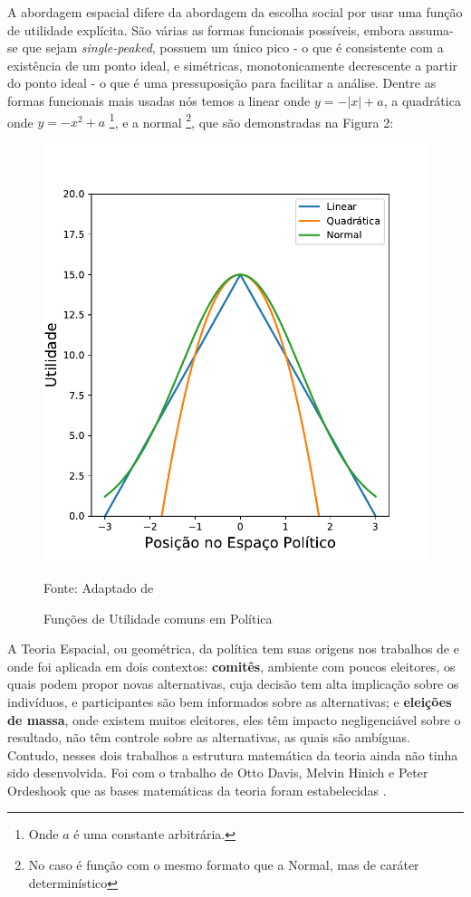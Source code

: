 A abordagem espacial difere da abordagem da escolha social por usar uma função
de utilidade explícita. São várias as formas funcionais possíveis, embora
assuma-se que sejam \textit{single-peaked}, possuem um único pico - o que é
consistente com a existência de um ponto ideal, e simétricas, monotonicamente
decrescente a partir do ponto ideal - o que é uma pressuposição para facilitar a
análise. Dentre as formas funcionais mais usadas nós temos a linear onde $y =
-|x| + a $, a quadrática onde $y = -x^2 + a$ \footnote{ Onde $a$ é uma constante
  arbitrária.}, e a normal \footnote{No caso é função com o mesmo formato que a
  Normal, mas de caráter determinístico}, que são demonstradas na Figura 2:

\begin{figure}[H]
  \centering \includegraphics[scale = 0.8]{ims/utilities.pdf}
  \caption{Funções de Utilidade comuns em Política}
  Fonte: Adaptado de 
\end{figure}

A Teoria Espacial, ou geométrica, da política tem suas origens nos trabalhos de
 e  onde foi aplicada
em dois contextos: \textbf{comitês}, ambiente com poucos eleitores, os quais
podem propor novas alternativas, cuja decisão tem alta implicação sobre os
indivíduos, e participantes são bem informados sobre as alternativas; e
\textbf{eleições de massa}, onde existem muitos eleitores, eles têm impacto
negligenciável sobre o resultado, não têm controle sobre as alternativas, as
quais são ambíguas. Contudo, nesses dois trabalhos a estrutura matemática da
teoria ainda não tinha sido desenvolvida. Foi com o trabalho de Otto Davis,
Melvin Hinich e Peter Ordeshook que as bases matemáticas da teoria foram
estabelecidas \cite{poole2005spatial}.

